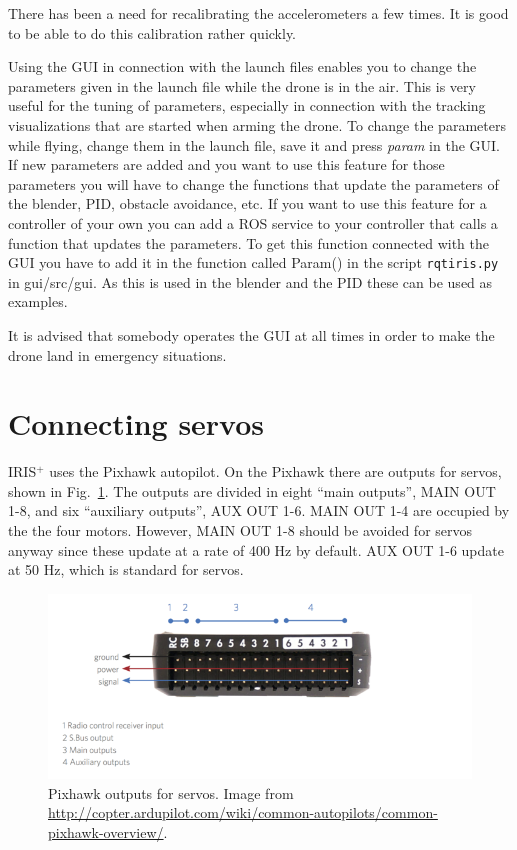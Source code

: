 \documentclass[titlepage,11pt,a4paper]{article}
\begin{document}
There has been a need for recalibrating the accelerometers a few
times. It is good to be able to do this calibration rather quickly.

Using the GUI in connection with the launch files enables you to
change the parameters given in the launch file while the drone is in
the air. This is very useful for the tuning of parameters, especially
in connection with the tracking visualizations that are started when
arming the drone. To change the parameters while flying, change them
in the launch file, save it and press \textit{param} in the GUI. If new
parameters are added and you want to use this feature for those
parameters you will have to change the functions that update the
parameters of the blender, PID, obstacle avoidance, etc. If you want
to use this feature for a controller of your own you can add a ROS
service to your controller that calls a function that updates the
parameters. To get this function connected with the GUI you have to
add it in the function called Param() in the script
\texttt{rqt\textunderscore iris.py} in gui/src/gui. As this is used in
the blender and the PID these can be used as examples.

It is advised that somebody operates the GUI at all times in order to
make the drone land in emergency situations.


\section{Connecting servos}
\label{sec:servos}
IRIS$^+$ uses the Pixhawk autopilot. On the Pixhawk there are outputs
for servos, shown in Fig.~\ref{fig:pixhawk_outputs}. The outputs are
divided in eight ``main outputs'', MAIN OUT 1-8, and six ``auxiliary
outputs'', AUX OUT 1-6. MAIN OUT 1-4 are occupied by the the four
motors. However, MAIN OUT 1-8 should be avoided for servos anyway
since these update at a rate of 400 Hz by default. AUX OUT 1-6 update
at 50 Hz, which is standard for servos.

\begin{figure}[h!]                                                               
  \centering
  \includegraphics[width=1.0\textwidth]{figures/pixhawk_outputs}
  \caption{Pixhawk outputs for servos. Image from
    \url{http://copter.ardupilot.com/wiki/common-autopilots/common-pixhawk-overview/}.}
  \label{fig:pixhawk_outputs}                                                              
\end{figure}
\end{document}
